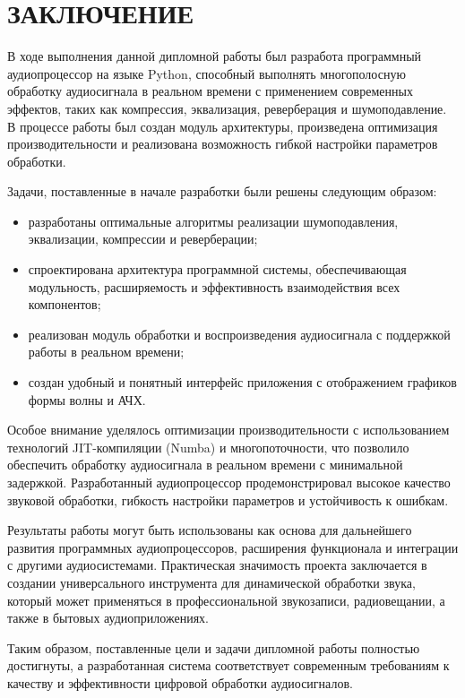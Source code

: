 \section*{ЗАКЛЮЧЕНИЕ}

В ходе выполнения данной дипломной работы был разработа программный аудиопроцессор на языке Python, способный выполнять многополосную обработку аудиосигнала в реальном времени с применением современных эффектов, таких как компрессия, эквализация, реверберация и шумоподавление. В процессе работы был создан модуль архитектуры, произведена оптимизация производительности и реализована возможность гибкой настройки параметров обработки.

Задачи, поставленные в начале разработки были решены следующим образом:
\begin{itemize}
	\item разработаны оптимальные алгоритмы реализации шумоподавления, эквализации, компрессии и реверберации;
	\item спроектирована архитектура программной системы, обеспечивающая модульность, расширяемость и эффективность взаимодействия всех компонентов;
	\item реализован модуль обработки и воспроизведения аудиосигнала с поддержкой работы в реальном времени;
	\item создан удобный и понятный интерфейс приложения с отображением графиков формы волны и АЧХ.
\end{itemize}

Особое внимание уделялось оптимизации производительности с использованием технологий JIT-компиляции (Numba) и многопоточности, что позволило обеспечить обработку аудиосигнала в реальном времени с минимальной задержкой. Разработанный аудиопроцессор продемонстрировал высокое качество звуковой обработки, гибкость настройки параметров и устойчивость к ошибкам.

Результаты работы могут быть использованы как основа для дальнейшего развития программных аудиопроцессоров, расширения функционала и интеграции с другими аудиосистемами. Практическая значимость проекта заключается в создании универсального инструмента для динамической обработки звука, который может применяться в профессиональной звукозаписи, радиовещании, а также в бытовых аудиоприложениях.

Таким образом, поставленные цели и задачи дипломной работы полностью достигнуты, а разработанная система соответствует современным требованиям к качеству и эффективности цифровой обработки аудиосигналов.